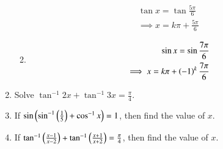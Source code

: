 \begin{enumerate}[label=\thesubsection.\arabic*,ref=\thesubsection.\theenumi]
\begin{enumerate}
\begin{align}
\tan x=\tan \frac{5\pi}{6}
\\
\implies
x = k\pi + \frac{5\pi}{6}
\end{align}
\item 
\begin{align}
\sin x=\sin \frac{7\pi}{6}
\\
	\implies x = k\pi + \left(-1\right)^k\frac{7\pi}{6}
\end{align}
\end{enumerate}
\item 	Solve $\tan^{-1}2x +\tan^{-1}3x=\frac{\pi}{4}$.
	\item If 
		$\sin\left(\sin^{-1}\left(\frac{1}{5}\right) + \cos^{-1}x\right)=1$, then find the value of $x$.
	\item If 
		$\tan^{-1}\left(\frac{x-1}{x-2}\right) +\tan^{-1}\left(\frac{x+1}{x+2}\right)=\frac{\pi}{4}$, then find the value of $x$.
\end{enumerate}
